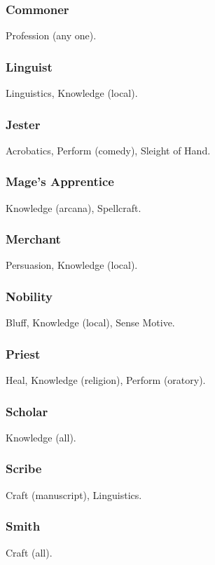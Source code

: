 \subsubsection{Commoner}
 Profession (any one).

\subsubsection{Linguist}
 Linguistics, Knowledge (local).

\subsubsection{Jester}
 Acrobatics, Perform (comedy), Sleight of Hand.

\subsubsection{Mage's Apprentice}
 Knowledge (arcana), Spellcraft.

\subsubsection{Merchant}
 Persuasion, Knowledge (local).

\subsubsection{Nobility}
 Bluff, Knowledge (local), Sense Motive.

\subsubsection{Priest}
 Heal, Knowledge (religion), Perform (oratory).

\subsubsection{Scholar}
 Knowledge (all).

\subsubsection{Scribe}
 Craft (manuscript), Linguistics.

\subsubsection{Smith}
 Craft (all).

